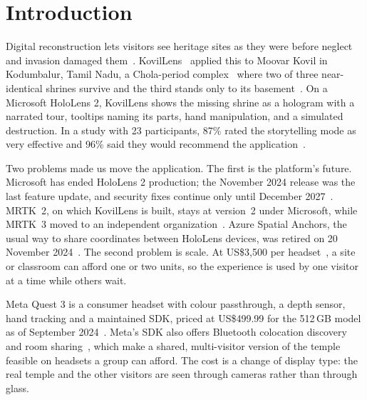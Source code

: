\documentclass[conference]{IEEEtran}
\begin{document}
\section{Introduction}
Digital reconstruction lets visitors see heritage sites as they were before neglect and invasion damaged them~\cite{innocente2023,bec2021}. KovilLens~\cite{kovillens2025} applied this to Moovar Kovil in Kodumbalur, Tamil Nadu, a Chola-period complex~\cite{orr2007} where two of three near-identical shrines survive and the third stands only to its basement~\cite{kovillens2025}. On a Microsoft HoloLens 2, KovilLens shows the missing shrine as a hologram with a narrated tour, tooltips naming its parts, hand manipulation, and a simulated destruction. In a study with 23 participants, 87\% rated the storytelling mode as very effective and 96\% said they would recommend the application~\cite{kovillens2025}.

Two problems made us move the application. The first is the platform's future. Microsoft has ended HoloLens 2 production; the November 2024 release was the last feature update, and security fixes continue only until December 2027~\cite{hl2eol,hl2discontinued}. MRTK~2, on which KovilLens is built, stays at version~2 under Microsoft, while MRTK~3 moved to an independent organization~\cite{mrtk2repo,mrtk3}. Azure Spatial Anchors, the usual way to share coordinates between HoloLens devices, was retired on 20 November 2024~\cite{asaretire}. The second problem is scale. At US\$3,500 per headset~\cite{hl2price}, a site or classroom can afford one or two units, so the experience is used by one visitor at a time while others wait.

Meta Quest 3 is a consumer headset with colour passthrough, a depth sensor, hand tracking and a maintained SDK, priced at US\$499.99 for the 512\,GB model as of September 2024~\cite{q3price,q3compare}. Meta's SDK also offers Bluetooth colocation discovery and room sharing~\cite{metacolocation,metaspacesharing}, which make a shared, multi-visitor version of the temple feasible on headsets a group can afford. The cost is a change of display type: the real temple and the other visitors are seen through cameras rather than through glass.
\end{document}

